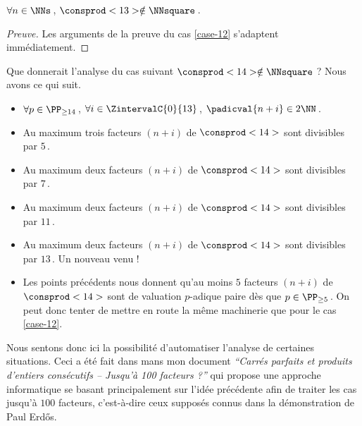 \begin{fact} \label{case-13}
	 $\forall n \in \NNs$\,, $\consprod<13> \notin \NNsquare$\,.
\end{fact}




\begin{proof}[Preuve]%
    Les arguments de la preuve du cas \ref{case-12} s'adaptent immédiatement.
\end{proof}




\begin{remark}
	Que donnerait l'analyse du cas suivant $\consprod<14> \notin \NNsquare$ ?
	Nous avons ce qui suit.
    \begin{itemize}
		\item $\forall p \in \PP_{\geq 14}$\,, 
    $\forall i \in \ZintervalC{0}{13}$\,, 
    $\padicval{n + i} \in 2 \NN$\,.
		
		\item Au maximum trois facteurs $(n + i)$ de $\consprod<14>$ sont divisibles par $5$\,.

		\item Au maximum deux facteurs $(n + i)$ de $\consprod<14>$ sont divisibles par $7$\,.

		\item Au maximum deux facteurs $(n + i)$ de $\consprod<14>$ sont divisibles par $11$\,.

		\item Au maximum deux facteurs $(n + i)$ de $\consprod<14>$ sont divisibles par $13$\,. Un nouveau venu !

		\item Les points précédents nous donnent qu'au moins $5$ facteurs $(n + i)$ de $\consprod<14>$ sont de valu\-ation $p$-adique paire dès que $p \in \PP_{\geq 5}$\,. On peut donc tenter de mettre en route la même machinerie que pour le cas \ref{case-12}. 
    \end{itemize}
    
    Nous sentons donc ici la possibilité d'automatiser l'analyse de certaines situations. 
    Ceci a été fait dans mans mon document \emph{\enquote{Carrés parfaits et produits d'entiers consécutifs -- Jusqu'à 100 facteurs ?}} qui propose une approche informatique se basant principalement sur l'idée précédente afin de traiter les cas jusqu'à $100$ facteurs, c'est-à-dire ceux supposés connus dans la démonstration de Paul Erdős.
\end{remark}
